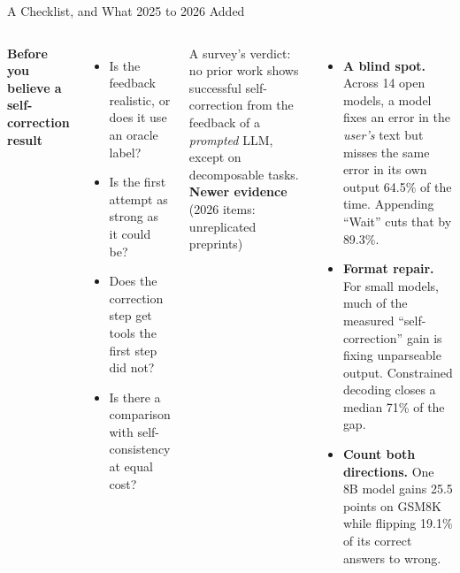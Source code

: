 \begin{frame}{A Checklist, and What 2025 to 2026 Added}
    \begin{columns}[T,onlytextwidth]
        \textbf{Before you believe a self-correction result}
        \begin{itemize}\itemsep0.35em
            \item Is the feedback realistic, or does it use an oracle label?
            \item Is the first attempt as strong as it could be?
            \item Does the correction step get tools the first step did not?
            \item Is there a comparison with self-consistency at equal cost?
        \end{itemize}
        \vspace{0.3em}
        {\small A survey's verdict: no prior work shows successful self-correction from the feedback of a \emph{prompted} LLM, except on decomposable tasks.}
        \textbf{Newer evidence} {\small (2026 items: unreplicated preprints)}
        \begin{itemize}\itemsep0.35em
            \item \textbf{A blind spot.} Across 14 open models, a model fixes an error in the \emph{user's} text but misses the same error in its own output 64.5\% of the time. Appending ``Wait'' cuts that by 89.3\%.
            \item \textbf{Format repair.} For small models, much of the measured ``self-correction'' gain is fixing unparseable output. Constrained decoding closes a median 71\% of the gap.
            \item \textbf{Count both directions.} One 8B model gains 25.5 points on GSM8K while flipping 19.1\% of its correct answers to wrong.
        \end{itemize}
    \end{columns}
    \vspace{0.2em}
\end{frame}

